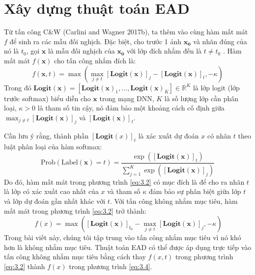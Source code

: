 \section{Xây dựng thuật toán EAD}

Từ tấn công C\&W (Carlini and Wagner 2017b), ta thêm vào cùng hàm mất mát $f$ để sinh 
ra các mẫu đối nghịch. Đặc biệt, cho trước 1 ảnh $\mathbf{x_0}$ và nhãn đúng của nó là $t_0$, 
gọi $\mathbf{x}$ là mẫu đối nghịch của $\mathbf{x_0}$ với lớp đích nhắm đến là $t \neq t_0$ . Hàm mất mát 
$f(\mathbf{x})$ cho tấn công nhắm đích là:
\begin{equation}
    \label{eq:3.2}
    f(\mathbf{x}, t) = \max { \left( \max_{j \neq t} [\textbf{Logit}(\mathbf{x})]_j - 
    [\textbf{Logit}(\mathbf{x})]_t, -\kappa \right) }
\end{equation}
Trong đó $\textbf{Logit}(\mathbf{x}) = [\textbf{Logit}(\mathbf{x})_1, ..., 
\textbf{Logit}(\mathbf{x})_K] 
\in \mathbb{R}^K$ là lớp logit (lớp trước softmax) biểu diễn cho $\mathbf{x}$ trong mạng DNN, $K$
là số lượng lớp cần phân loại, $\kappa > 0$ là tham số tin cậy, nó đảm bảo một khoảng 
cách cố định giữa $\max_{j \neq t} [\textbf{Logit}(\mathbf{x})]_j$ và $[\textbf{Logit}(\mathbf{x})]_t$. 

Cần lưu ý rằng, thành phần $[\textbf{Logit}(x)]_t$ là xác xuất dự đoán $x$ có nhãn $t$ theo 
luật phân loại của hàm softmax:
\begin{equation}
    \label{eq:3.3}
    \text{Prob}(\text{Label}(\mathbf{x}) = t) = \frac{\exp([\textbf{Logit}(\mathbf{x})]_t)}{
        \sum_{j=1}^{K} \exp([\textbf{Logit}(\mathbf{x})]_j)
    }
\end{equation}
Do đó, hàm mất mát trong phương trình \ref{eq:3.2} có mục đích là để cho ra nhãn $t$ là 
lớp có xác xuất cao nhất của $x$ và tham số $\kappa$ đảm bảo sự phân biệt giữa lớp $t$
và lớp dự đoán gần nhất khác với $t$. Với tấn công không nhắm mục tiêu, hàm mất mát trong 
phương trình \ref{eq:3.2} trở thành:
\begin{equation}
    \label{eq:3.4}\
    f(x) = \max { \left([\textbf{Logit}(\mathbf{x})]_{t_0} - 
    \max_{j \neq t} [\textbf{Logit}(\mathbf{x})]_j, -\kappa \right) }
\end{equation}
Trong bài viết này, chúng tôi tập trung vào tấn công nhắm mục tiêu vì nó khó hơn là không 
nhắm mục tiêu. Thuật toán EAD có thể được áp dụng trực tiếp vào tấn công không nhắm mục 
tiêu bằng cách thay $f(x,t)$ trong phương trình \ref{eq:3.2} thành $f(x)$ trong phương 
trình \ref{eq:3.4}. 

